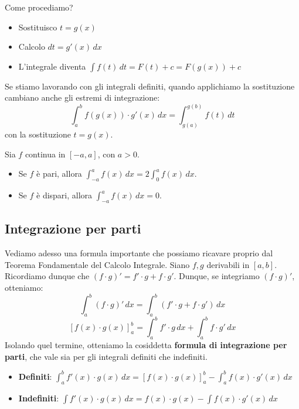 \documentclass[12pt]{report}
\begin{document}
	Come procediamo?
	\begin{itemize}
		
		\item Sostituisco $t = g(x)$
		
		\item Calcolo $dt = g'(x) \, dx$
		
		\item L'integrale diventa $\int f(t) \, dt = F(t) + c = F(g(x)) + c$
		
	\end{itemize}
	
	Se stiamo lavorando con gli integrali definiti, quando applichiamo la sostituzione cambiano anche gli estremi di integrazione:
	\[
	\int_{a}^{b} f(g(x)) \cdot g'(x) \, dx = \int_{g(a)}^{g(b)} f(t) \, dt
	\]
	con la sostituzione $t = g(x)$.
	
	\begin{proposizione}{}{}
		
		Sia $f$ continua in $[-a, a]$, con $a > 0$.
		
		\begin{itemize}
			
			\item Se $f$ è pari, allora $\int_{-a}^{a} f(x) \, dx = 2 \int_{0}^{a} f(x) \, dx$.
			
			\item Se $f$ è dispari, allora $\int_{-a}^{a} f(x) \, dx = 0$.
			
		\end{itemize}
		
	\end{proposizione}
	
	\subsection{Integrazione per parti}
	
	Vediamo adesso una formula importante che possiamo ricavare proprio dal Teorema Fondamentale del Calcolo Integrale.
	Siano $f, g$ derivabili in $[a, b]$. Ricordiamo dunque che $(f \cdot g)' = f' \cdot g + f \cdot g'$.
	Dunque, se integriamo $(f \cdot g)'$, otteniamo:
	\[
	\int_{a}^{b} (f \cdot g)' \, dx = \int_{a}^{b} (f' \cdot g + f \cdot g') \, dx
	\]
	\[
	[f(x) \cdot g(x)]_{a}^{b} = \int_{a}^{b} f' \cdot g \, dx + \int_{a}^{b} f \cdot g' \, dx
	\]
	Isolando quel termine, otteniamo la cosiddetta \textbf{formula di integrazione per parti}, che vale sia per gli integrali definiti che indefiniti.
	
	\begin{itemize}
		
		\item \textbf{Definiti}: $\int_{a}^{b} f'(x) \cdot g(x) \, dx = [f(x) \cdot g(x)]_{a}^{b} - \int_{a}^{b} f(x) \cdot g'(x) \, dx$
		
		\item \textbf{Indefiniti}: $\int f'(x) \cdot g(x) \, dx = f(x) \cdot g(x) - \int f(x) \cdot g'(x) \, dx$
		
	\end{itemize}
	
\end{document}
